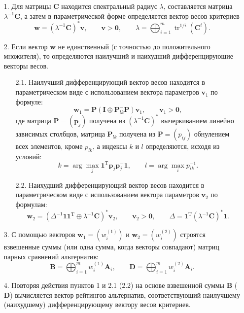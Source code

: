 \documentclass[specialist, substylefile = spbureport.rtx,
    subf,href,colorlinks=true, 12pt]{disser}
\begin{document}
    \begin{itemize}
        \item[1.]
        Для матрицы $\bm{C}$ находится спектральный радиус $\lambda$, составляется матрица $\lambda^{-1}\bm{C}$, а затем в параметрической форме определяется вектор весов критериев
        $$
        \bm{w}
        =
        (\lambda^{-1}\bm{C})^{\ast}\bm{v},
        \qquad
        \bm{v}>\bm{0},
        \qquad
        \lambda
        =
        \bigoplus_{i=1}^{m}{\mathop\mathrm{tr}}^{1/i}(\bm{C}^{i}).
        $$
        \item[2.]
        Если вектор $\bm{w}$ не единственный (с точностью до положительного множителя), то определяются наилучший и наихудший дифференцирующие векторы весов.
        \begin{itemize}
        \item[2.1.]
        Наилучший дифференцирующий вектор весов находится в параметрическом виде с использованием вектора параметров $\bm{v}_{1}$ по формуле:
        $$
        \bm{w}_{1}
        =
        \bm{P}(\bm{I}\oplus\bm{P}_{lk}^{-}\bm{P})\bm{v}_{1},
        \qquad
        \bm{v}_{1}
        >
        \bm{0},
        $$
        где матрица $\bm{P}=(\bm{p}_{j})$ получена из $(\lambda^{-1}\bm{C})^{\ast}$ вычеркиванием линейно зависимых столбцов, матрица $\bm{P}_{lk}$ получена из $\bm{P}=(p_{ij})$ обнулением всех элементов, кроме $p_{lk}$, а индексы $k$ и $l$ определяются, исходя из условий:
        $$
        k
        =
        \arg\max_{j}\bm{1}^{\mathrm{T}}\bm{p}_{j}\bm{p}_{j}^{-}\bm{1},
        \qquad
        l
        =
        \arg\max_{i}p_{ik}^{-1}.
        $$
        \item[2.2.]
        Наихудший дифференцирующий вектор весов находится в параметрическом виде с использованием вектора параметров $\bm{v}_{2}$ по формулам:
        $$
        \bm{w}_{2}
        =
        (\Delta^{-1}\bm{1}\bm{1}^{\mathrm{T}}\oplus\lambda^{-1}\bm{C})^{\ast}\bm{v}_{2},
        \qquad
        \bm{v}_{2}
        >
        \bm{0},
        \qquad
        \Delta
        =
        \bm{1}^{\mathrm{T}}(\lambda^{-1}\bm{C})^{\ast}\bm{1}.
        $$
        \end{itemize}
        \item[3.]
        С помощью векторов $\bm{w}_{1}=(w_{i}^{(1)})$ и $\bm{w}_{2}=(w_{i}^{(2)})$ строятся взвешенные суммы (или одна сумма, когда векторы совпадают) матриц парных сравнений альтернатив:
        $$
        \bm{B}
        =
        \bigoplus_{i=1}^{m}w^{(1)}_{i}\bm{A}_{i},
        \qquad
        \bm{D}
        =
        \bigoplus_{i=1}^{m}w^{(2)}_{i}\bm{A}_{i}.
        $$
        \item[4.]
        Повторяя действия пунктов 1 и 2.1 (2.2) на основе взвешенной суммы $\bm{B}$ ($\bm{D}$) вычисляется вектор рейтингов альтернатив, соответствующий наилучшему (наихудшему) дифференцирующему вектору весов критериев.
        \end{itemize}
\end{document}
